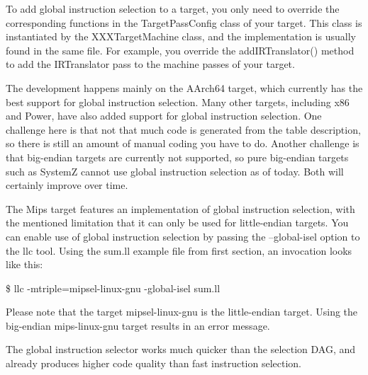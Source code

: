 To add global instruction selection to a target, you only need to override the corresponding functions in the TargetPassConfig class of your target. This class is instantiated by the XXXTargetMachine class, and the implementation is usually found in the same file. For example, you override the addIRTranslator() method to add the IRTranslator pass to the machine passes of your target.\par

The development happens mainly on the AArch64 target, which currently has the best support for global instruction selection. Many other targets, including x86 and Power, have also added support for global instruction selection. One challenge here is that not that much code is generated from the table description, so there is still an amount of manual coding you have to do. Another challenge is that big-endian targets are currently not supported, so pure big-endian targets such as SystemZ cannot use global instruction selection as of today. Both will certainly improve over time.\par

The Mips target features an implementation of global instruction selection, with the mentioned limitation that it can only be used for little-endian targets. You can enable use of global instruction selection by passing the –global-isel option to the llc tool. Using the sum.ll example file from first section, an invocation looks like this:\par

\begin{tcolorbox}[colback=white,colframe=black]
\$ llc -mtriple=mipsel-linux-gnu -global-isel sum.ll
\end{tcolorbox}

Please note that the target mipsel-linux-gnu is the little-endian target. Using the big-endian mips-linux-gnu target results in an error message.\par

The global instruction selector works much quicker than the selection DAG, and already produces higher code quality than fast instruction selection.\par








